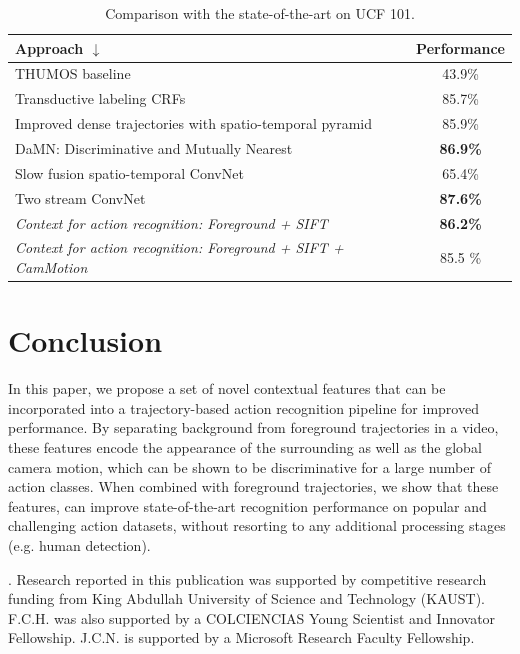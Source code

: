 \documentclass[runningheads]{llncs}
\begin{document}
\begin{table}[!h]
\caption{Comparison with the state-of-the-art on UCF 101.}
\begin{center}
{
\begin{tabular}{ |l|c| }
\hline
Approach $\downarrow$ & Performance\\
\hline
THUMOS \cite{thumos2013} baseline & 43.9\% \\
\hline
Transductive labeling CRFs \cite{karaman2013} & 85.7\% \\
Improved dense trajectories with spatio-temporal pyramid \cite{wang_thumos} & 85.9\% \\
DaMN: Discriminative and Mutually Nearest \cite{hou2014} & \textbf{86.9\%} \\
\hline
Slow fusion spatio-temporal ConvNet \cite{karpathy2013} & 65.4\% \\
Two stream ConvNet \cite{simonyan2014} & \textbf{87.6\%} \\
\hline
\emph{Context for action recognition: Foreground + SIFT} & \textbf{86.2\%} \\
\emph{Context for action recognition: Foreground + SIFT + CamMotion} & 85.5 \% \\
\hline
\end{tabular}
}
\end{center}
\label{tab:ucf101}
\end{table}

\section{Conclusion}
In this paper, we propose a set of novel contextual features that can be incorporated into a trajectory-based action recognition pipeline for improved performance. By separating background from foreground trajectories in a video, these features encode the appearance of the surrounding as well as the global camera motion, which can be shown to be discriminative for a large number of action classes. When combined with foreground trajectories, we show that these features, can improve state-of-the-art recognition performance on popular and challenging action datasets, without resorting to any additional processing stages (e.g. human detection). 

\vspace{3mm}
. Research reported in this publication was supported by competitive research funding from King Abdullah University of Science and Technology (KAUST). F.C.H. was also supported by a COLCIENCIAS Young  Scientist and Innovator Fellowship. J.C.N. is supported by a Microsoft Research Faculty Fellowship.
\end{document}
